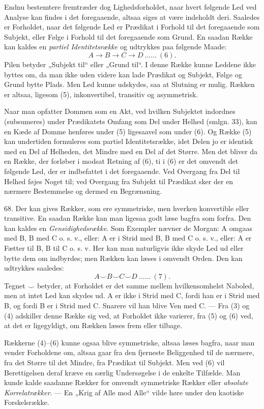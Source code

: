 \documentclass[12pt,a4paper]{book}
\newcommand{\apage}[1]{\marginnote{\footnotesize\textit{[#1]}}}
\begin{document}
Endnu bestemtere fremtræder dog Lighedsforholdet, naar hvert følgende Led ved
Analyse kan findes i det foregaaende, altsaa siges at være indeholdt deri.
Saaledes er Forholdet, naar det følgende Led er Prædikat i Forhold til det
foregaaende som Subjekt, eller Følge i Forhold til det foregaaende som Grund.
En saadan Række kan kaldes en \emph{partiel Identitetsrække} og udtrykkes paa
følgende Maade:
\[ A \to B \to C \to D \ \ldots\ldots\ (6). \]
Pilen betyder „Subjekt til“ eller „Grund til“. I denne Række kunne Leddene ikke
byttes om, da man ikke uden videre kan lade Prædikat og Subjekt, Følge og Grund
bytte Plads. Men Led kunne udskydes, saa at Slutning er mulig. Rækken er
altsaa, ligesom (5), inkonvertibel, transitiv og asymmetrisk.

Naar man opfatter Dommen som en Akt, ved hvilken Subjektet indordnes
(subsumeres) under Prædikatets Omfang som Del under Helhed (smlgn. 33), kan en
Kæde af Domme henføres under (5) ligesaavel som under (6). Og Række (5) kan
undertiden formuleres som partiel Identitetsrække, idet \apage{169} Delen jo er identisk
med en Del af Helheden, det Mindre med en Del af det Større. Men det bliver da
en Række, der forløber i modsat Retning af (6), ti i (6) er det omvendt det
følgende Led, der er indbefattet i det foregaaende. Ved Overgang fra Del til
Helhed føjes Noget til; ved Overgang fra Subjekt til Prædikat sker der en
nærmere Bestemmelse og dermed en Begrænsning.

68. Der kan gives Rækker, som ere symmetriske, men hverken konvertible eller
transitive. En saadan Række kan man ligesaa godt læse bagfra som forfra. Den
kan kaldes en \emph{Gensidighedsrække}. Som Exempler nævner de Morgan: A omgaas
med B, B med C o. s. v., eller: A er i Strid med B, B med C o. s. v., eller: A
er Fætter til B, B til C o. s. v. Her kan man naturligvis ikke skyde Led ud
eller bytte dem om indbyrdes; men Rækken kan læses i omvendt Orden. Den kan
udtrykkes saaledes:
\[ A \smile B \smile C \smile D \ \ldots\ldots\ (7). \]
Tegnet $\smile$ betyder, at Forholdet er det samme mellem hvilkensomhelst Naboled, men at intet Led kan skydes ud. A er ikke i Strid med C, fordi han er
i Strid med B, og fordi B er i Strid med C. Snarere vil han blive Ven med C.
--- Fra (3) og (4) adskiller denne Række sig ved, at Forholdet ikke varierer,
fra (5) og (6) ved, at det er ligegyldigt, om Rækken læses frem eller tilbage.

Rækkerne (4)--(6) kunne ogsaa blive symmetriske, altsaa læses bagfra, naar man
vender Forholdene om, altsaa gaar fra den fjerneste Beliggenhed til de nærmere,
fra det Større til det Mindre, fra Prædikat til Subjekt. Men ved (6) vil
Berettigelsen deraf kræve en særlig Undersøgelse i de enkelte Tilfælde. Man
kunde kalde saadanne Rækker for omvendt symmetriske Rækker eller \emph{absolute
Korrelatrækker}. --- En „Krig af Alle mod Alle“ vilde høre under den kaotiske
Forskelsrække.
\end{document}
